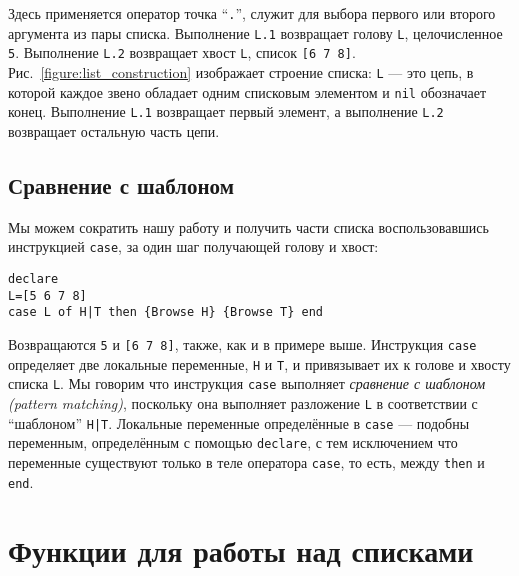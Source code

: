 Здесь применяется оператор точка ``\lstinline|.|'', служит для выбора первого или второго аргумента из пары списка. Выполнение \lstinline|L.1| возвращает голову \lstinline|L|, целочисленное \lstinline|5|. Выполнение \lstinline|L.2| возвращает хвост \lstinline|L|, список \lstinline|[6 7 8]|. Рис.~\ref{figure:list_construction} изображает строение списка: \lstinline|L| --- это цепь, в которой каждое звено обладает одним списковым элементом и \lstinline|nil| обозначает конец. Выполнение \lstinline|L.1| возвращает первый элемент, а выполнение \lstinline|L.2| возвращает остальную часть цепи.

\subsection{Сравнение с шаблоном}\label{Pattern_Matching}

Мы можем сократить нашу работу и получить части списка воспользовавшись инструкцией \lstinline|case|, за один шаг получающей голову и хвост:

\begin{lstlisting}
declare
L=[5 6 7 8]
case L of H|T then {Browse H} {Browse T} end
\end{lstlisting}

Возвращаются \lstinline|5| и \lstinline|[6 7 8]|, также, как и в примере выше. Инструкция \lstinline|case| определяет две локальные переменные, \lstinline|H| и \lstinline|T|, и привязывает их к голове и хвосту списка \lstinline|L|. Мы говорим что инструкция \lstinline|case| выполняет \emph{сравнение с шаблоном (pattern matching)}, поскольку она выполняет разложение \lstinline|L| в соответствии с ``шаблоном'' \lstinline!H|T!. Локальные переменные определённые в \lstinline|case| --- подобны переменным, определённым с помощью \lstinline|declare|, с тем исключением что переменные существуют только в теле оператора \lstinline|case|, то есть, между \lstinline|then| и \lstinline|end|.

\section{Функции для работы над списками}\label{section_functions_over_lists}

